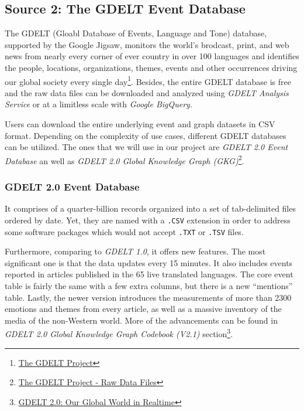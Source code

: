 \documentclass{article}
\begin{document}
\subsection{Source 2: The GDELT Event Database}
The GDELT (Gloabl Database of Events, Language and Tone) database, supported by the Google Jigsaw, monitors the world's brodcast, print, and web news from nearly every corner of ever country in over 100 languages and identifies the people, locations, organizations, themes, events and other occurrences driving our global society every single day\footnote{\href{https://www.gdeltproject.org/}{The GDELT Project}}. Besides, the entire GDELT database is free and the raw data files can be downloaded and analyzed using \textit{GDELT Analysis Service} or at a limitless scale with \textit{Google BigQuery}.


Users can download the entire underlying event and graph datasets in CSV format. Depending on the complexity of use cases, different GDELT databases can be utilized. The ones that we will use in our project are \textit{GDELT 2.0 Event Database} an well as \textit{GDELT 2.0 Global Knowledge Graph (GKG)}\footnote{\href{https://www.gdeltproject.org/data.html\#rawdatafiles}{The GDELT Project - Raw Data Files}}. 


\subsubsection{GDELT 2.0 Event Database}
It comprises of  a quarter-billion records organized into a set of tab-delimited files ordered by date. Yet, they are named with a \texttt{.CSV} extension in order to address some software packages which would not accept \texttt{.TXT} or \texttt{.TSV} files. 

Furthermore, comparing to \textit{GDELT 1.0}, it offers new features. The most significant one is that the data updates every 15 minutes. It also includes events reported in articles published in the 65 live translated languages. The core event table is fairly the same with a few extra columns, but there is a new ``mentions'' table. Lastly, the newer version introduces the measurements of more than 2300 emotions and themes from every article, as well as a massive inventory of the media of the non-Western world. More of the advancements can be found in \textit{GDELT 2.0 Global Knowledge Graph Codebook (V2.1)} section\footnote{\href{https://blog.gdeltproject.org/gdelt-2-0-our-global-world-in-realtime/}{GDELT 2.0: Our Global World in Realtime}}.   
\end{document}
